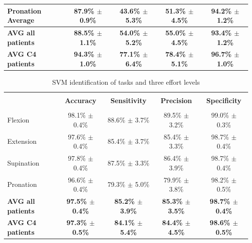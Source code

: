 \begin{table}[]
\begin{tabular}{lcccc}
\textbf{Pronation Average}  & \textbf{87.9\% $\pm$ 0.9\%} & \textbf{43.6\% $\pm$ 5.3\%} & \textbf{51.3\% $\pm$ 4.5\%} & \textbf{94.2\% $\pm$ 1.2\%} \\ \hline \hline
\textbf{AVG all patients}   & \textbf{88.5\% $\pm$ 1.1\%} & \textbf{54.0\% $\pm$ 5.2\%} & \textbf{55.0\% $\pm$ 4.5\%} & \textbf{93.4\% $\pm$ 1.2\%} \\
\textbf{AVG C4 patients}    & \textbf{94.3\% $\pm$ 1.0\%} & \textbf{77.1\% $\pm$ 6.4\%} & \textbf{78.4\% $\pm$ 5.1\%} & \textbf{96.7\% $\pm$ 1.0\%}
\end{tabular}
\end{table}

\begin{table}[]
\centering
\caption{SVM identification of tasks and three effort levels}
\label{tb:2-7}
\begin{tabular}{lcccc}
 & & & &\\
                          & \textbf{Accuracy}           & \textbf{Sensitivity}        & \textbf{Precision}          & \textbf{Specificity}        \\ \hline
                          &                             &                             &                             &                             \\
Flexion                   & 98.1\% $\pm$ 0.4\%          & 88.6\% $\pm$ 3.7\%          & 89.5\% $\pm$ 3.2\%          & 99.0\% $\pm$ 0.3\%          \\
Extension                 & 97.6\% $\pm$ 0.4\%          & 85.4\% $\pm$ 3.7\%          & 85.4\% $\pm$ 3.3\%          & 98.7\% $\pm$ 0.4\%          \\
Supination                & 97.8\% $\pm$ 0.4\%          & 87.5\% $\pm$ 3.3\%          & 86.4\% $\pm$ 3.9\%          & 98.7\% $\pm$ 0.4\%          \\
Pronation                 & 96.6\% $\pm$ 0.4\%          & 79.3\% $\pm$ 5.0\%          & 79.9\% $\pm$ 3.8\%          & 98.2\% $\pm$ 0.5\%          \\ \hline \hline
\textbf{AVG all patients} & \textbf{97.5\% $\pm$ 0.4\%} & \textbf{85.2\% $\pm$ 3.9\%} & \textbf{85.3\% $\pm$ 3.5\%} & \textbf{98.7\% $\pm$ 0.4\%} \\
\textbf{AVG C4 patients}  & \textbf{97.3\% $\pm$ 0.5\%} & \textbf{84.1\% $\pm$ 5.4\%} & \textbf{84.4\% $\pm$ 4.5\%} & \textbf{98.6\% $\pm$ 0.5\%}
\end{tabular}
\end{table}

